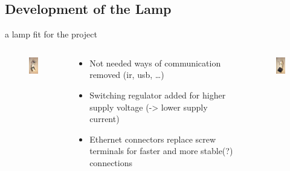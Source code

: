 \documentclass{beamer}
\begin{document}
 \subsection{Development of the Lamp}
  \begin{frame}{a lamp fit for the project}
    \begin{columns}
      \begin{column}{3.5cm}
        \begin{figure}
          \begin{center}
          \includegraphics[width=3cm]{bilder/lampe1.JPG}
          \end{center}
        \end{figure}
      \end{column}
      \begin{column}{5cm}
        \begin{itemize}
        \item Not needed ways of communication removed (ir, usb, \ldots)
        \item Switching regulator added for higher supply voltage (-> lower supply current)
        \item Ethernet connectors replace screw terminals for faster and more stable(?) connections 
        \end{itemize}
      \end{column}
      \begin{column}{3.5cm}
         \begin{figure}
          \begin{center}
          \includegraphics[width=3cm]{bilder/lampe2.JPG}
          \end{center}
        \end{figure}
     \end{column}
    \end{columns}
  \end{frame}
\end{document}
